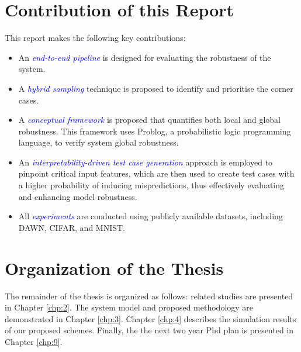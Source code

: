 \section{Contribution of this Report}


This report makes the following key contributions: %

\begin{itemize}
    \item An \textit{\textcolor{blue}{end-to-end pipeline}} is designed for evaluating the robustness of the system.
    \item A \textit{\textcolor{blue}{hybrid sampling}} technique is proposed to identify and prioritise the corner cases.
    \item A \textit{\textcolor{blue}{conceptual framework}} is proposed that quantifies both local and global robustness. This framework uses Problog, a probabilistic logic programming language, to verify system global robustness.
    \item An \textit{\textcolor{blue}{interpretability-driven test case generation}} approach is employed to pinpoint critical input features, which are then used to create test cases with a higher probability of inducing mispredictions, thus effectively evaluating and enhancing model robustness.
    \item All \textit{\textcolor{blue}{experiments}} are conducted using publicly available datasets, including DAWN, CIFAR, and MNIST.
\end{itemize}

\begin{center}
    \end{center}
\section{Organization of the Thesis}\hypertarget{organization of thesis}{}
The remainder of the thesis is organized as follows: related studies are presented in Chapter \ref{chp:2}. The system model and proposed methodology are demonstrated in Chapter \ref{chp:3}. Chapter \ref{chp:4} describes the simulation results of our proposed schemes. Finally, the the next two year Phd plan is presented in Chapter \ref{chp:9}.


\clearpage

